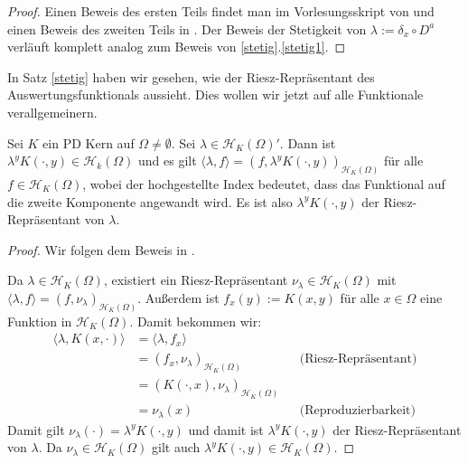 \begin{proof}
Einen Beweis des ersten Teils findet man im Vorlesungsskript von \textcite[Proposition 7.13]{Santin.2017} und einen Beweis des zweiten Teils in \textcite[Proposition 3.14]{Santin.2017}. Der Beweis der Stetigkeit von $\lambda := \delta_x \circ D^a$ verläuft komplett analog zum Beweis von \ref{stetig}.\ref{stetig1}.
\end{proof}

In Satz \ref{stetig} haben wir gesehen, wie der Riesz-Repräsentant des Auswertungsfunktionals aussieht. Dies wollen wir jetzt auf alle Funktionale verallgemeinern.

\begin{theorem}
\label{Riesz}
Sei $K$ ein \ac{PD} Kern auf $\Omega \neq \emptyset$. Sei $\lambda \in \mathcal{H}_K (\Omega)'$. Dann ist $\lambda^y K(\cdot,y) \in \mathcal{H}_k(\Omega)$ und es gilt $\langle \lambda,f \rangle = \left(f,\lambda^y K(\cdot,y)\right)_{\mathcal{H}_K(\Omega)}$ für alle $f \in \mathcal{H}_K(\Omega)$, wobei der hochgestellte Index bedeutet, dass das Funktional auf die zweite Komponente angewandt wird. Es ist also $\lambda^y K(\cdot,y)$ der Riesz-Repräsentant von $\lambda$.
\end{theorem}

\begin{proof}
Wir folgen dem Beweis in \textcite[Proposition 7.8]{Santin.2017}.

Da $\lambda \in \mathcal{H}_K(\Omega)$, existiert ein Riesz-Repräsentant $\nu_\lambda \in \mathcal{H}_K(\Omega)$ mit $\langle \lambda ,f \rangle = \left(f, \nu_\lambda\right)_{\mathcal{H}_K(\Omega)}$. Außerdem ist $f_x(y) := K(x,y)$ für alle $x \in \Omega$ eine Funktion in $\mathcal{H}_K (\Omega)$. Damit bekommen wir:
\begin{align*}
\langle \lambda, K(x,\cdot) \rangle &= \langle \lambda,f_x \rangle\\ 
&= \left(f_x, \nu_\lambda\right)_{\mathcal{H}_K (\Omega)} &&\text{(Riesz-Repräsentant)}\\ 
&= \left(K(\cdot,x), \nu_\lambda\right)_{\mathcal{H}_K (\Omega)}\\ 
&= \nu_\lambda(x) &&\text{(Reproduzierbarkeit)}
\end{align*}
Damit gilt $\nu_\lambda(\cdot) = \lambda^y K(\cdot,y)$ und damit ist $\lambda^yK(\cdot,y)$ der Riesz-Repräsentant von $\lambda$. Da $\nu_\lambda \in \mathcal{H}_K (\Omega)$ gilt auch $\lambda^y K(\cdot,y) \in \mathcal{H}_K (\Omega)$.
\end{proof}

